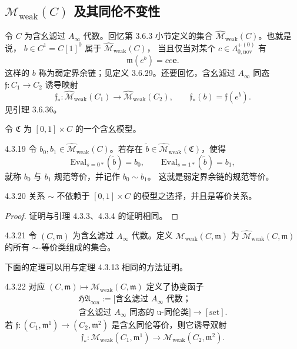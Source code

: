 
\subsection{$\mathcal M_{\mathrm{weak}}(C)$ 及其同伦不变性}
\label{subsec:4-3-2}

令 $C$ 为含幺滤过 $A_\infty$ 代数。回忆第 3.6.3 小节定义的集合
$\widehat{\mathcal M}_{\mathrm{weak}}(C)$。也就是说，
$b\in C^1=C[1]^0$ 属于 $\widehat{\mathcal M}_{\mathrm{weak}}(C)$，
当且仅当对某个 $c\in\Lambda^{+(0)}_{0,\mathrm{nov}}$ 有
\[
 \mathfrak m(e^b)=ce\mathbf e.
\]
这样的 $b$ 称为弱定界余链；见定义 3.6.29。还要回忆，含幺滤过
$A_\infty$ 同态 $\mathfrak f\colon C_1\to C_2$ 诱导映射
\[
 \mathfrak f_*\colon
 \widehat{\mathcal M}_{\mathrm{weak}}(C_1)
 \longrightarrow
 \widehat{\mathcal M}_{\mathrm{weak}}(C_2),
 \qquad
 \mathfrak f_*(b)=\mathfrak f(e^b).
\]
见引理 3.6.36。

令 $\mathfrak C$ 为 $[0,1]\times C$ 的一个含幺模型。

\begin{definition}{4.3.19}\label{def:4-3-19}
令 $b_0,b_1\in\widehat{\mathcal M}_{\mathrm{weak}}(C)$。若存在
$\widetilde b\in\widehat{\mathcal M}_{\mathrm{weak}}(\mathfrak C)$，使得
\[
 \mathrm{Eval}_{s=0*}(\widetilde b)=b_0,
 \qquad
 \mathrm{Eval}_{s=1*}(\widetilde b)=b_1,
\]
就称 $b_0$ 与 $b_1$ 规范等价，并记作 $b_0\sim b_1$。
这就是弱定界余链的规范等价。
\end{definition}

\begin{lemma}{4.3.20}\label{lem:4-3-20}
关系 $\sim$ 不依赖于 $[0,1]\times C$ 的模型之选择，并且是等价关系。
\end{lemma}

\begin{proof}
证明与引理 4.3.3、4.3.4 的证明相同。
\end{proof}

\begin{definition}{4.3.21}\label{def:4-3-21}
令 $(C,\mathfrak m)$ 为含幺滤过 $A_\infty$ 代数。定义
$\mathcal M_{\mathrm{weak}}(C,\mathfrak m)$ 为
$\widehat{\mathcal M}_{\mathrm{weak}}(C,\mathfrak m)$ 的所有
$\sim$-等价类组成的集合。
\end{definition}

下面的定理可以用与定理 4.3.13 相同的方法证明。

\begin{theorem}{4.3.22}\label{thm:4-3-22}
对应
$(C,\mathfrak m)\longmapsto\mathcal M_{\mathrm{weak}}(C,\mathfrak m)$
定义了协变函子
{\small
\[
 \begin{gathered}
 \mathfrak{HA}_{\infty u}:=
 [\text{含幺滤过 }A_\infty\text{ 代数；}\\[-0.2em]
 \text{含幺滤过 }A_\infty\text{ 同态的 u-同伦类}]
 \longrightarrow[\mathrm{set}].
 \end{gathered}
\]
}
若
$\mathfrak f\colon(C_1,\mathfrak m^1)\to(C_2,\mathfrak m^2)$
是含幺同伦等价，则它诱导双射
\[
 \mathfrak f_*\colon
 \mathcal M_{\mathrm{weak}}(C_1,\mathfrak m^1)
 \longrightarrow
 \mathcal M_{\mathrm{weak}}(C_2,\mathfrak m^2).
\]
\end{theorem}

